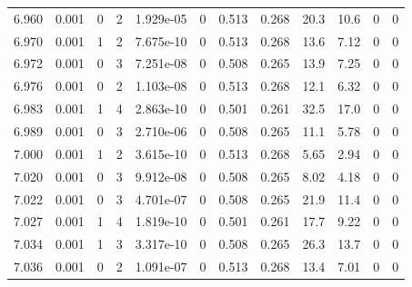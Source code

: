 \documentclass[preview]{standalone}
\begin{document}
{{{{{{{{{{{{{{{{{{{\begin{tabular}{L{1.2cm}C{1.2cm} C{0.3cm}C{0.5cm} C{1.4cm}C{1.4cm} C{1.4cm}C{1.4cm} C{1.6cm}C{1.6cm} C{1.6cm}C{1.6cm}}
  6.960  &  0.001  & 0     &  2 &  1.929e-05  & 0  &  0.513&   0.268& 20.3 & 10.6   &  0 & 0  \\ 
  6.970  &  0.001  & 1     &  2 &  7.675e-10  & 0  &  0.513&   0.268& 13.6 & 7.12   &  0 & 0  \\ 
  6.972  &  0.001  & 0     &  3 &  7.251e-08  & 0  &  0.508&   0.265& 13.9 & 7.25   &  0 & 0  \\ 
  6.976  &  0.001  & 0     &  2 &  1.103e-08  & 0  &  0.513&   0.268& 12.1 & 6.32   &  0 & 0  \\ 
  6.983  &  0.001  & 1     &  4 &  2.863e-10  & 0  &  0.501&   0.261& 32.5 & 17.0   &  0 & 0  \\ 
  6.989  &  0.001  & 0     &  3 &  2.710e-06  & 0  &  0.508&   0.265& 11.1 & 5.78   &  0 & 0  \\ 
  7.000  &  0.001  & 1     &  2 &  3.615e-10  & 0  &  0.513&   0.268& 5.65 & 2.94   &  0 & 0  \\ 
  7.020  &  0.001  & 0     &  3 &  9.912e-08  & 0  &  0.508&   0.265& 8.02 & 4.18   &  0 & 0  \\ 
  7.022  &  0.001  & 0     &  3 &  4.701e-07  & 0  &  0.508&   0.265& 21.9 & 11.4   &  0 & 0  \\ 
  7.027  &  0.001  & 1     &  4 &  1.819e-10  & 0  &  0.501&   0.261& 17.7 & 9.22   &  0 & 0  \\ 
  7.034  &  0.001  & 1     &  3 &  3.317e-10  & 0  &  0.508&   0.265& 26.3 & 13.7   &  0 & 0  \\ 
  7.036  &  0.001  & 0     &  2 &  1.091e-07  & 0  &  0.513&   0.268& 13.4 & 7.01   &  0 & 0  \\ 
\hline 
\end{tabular} 

}}}}}}}}}}}}}}}}}}}
\end{document}
